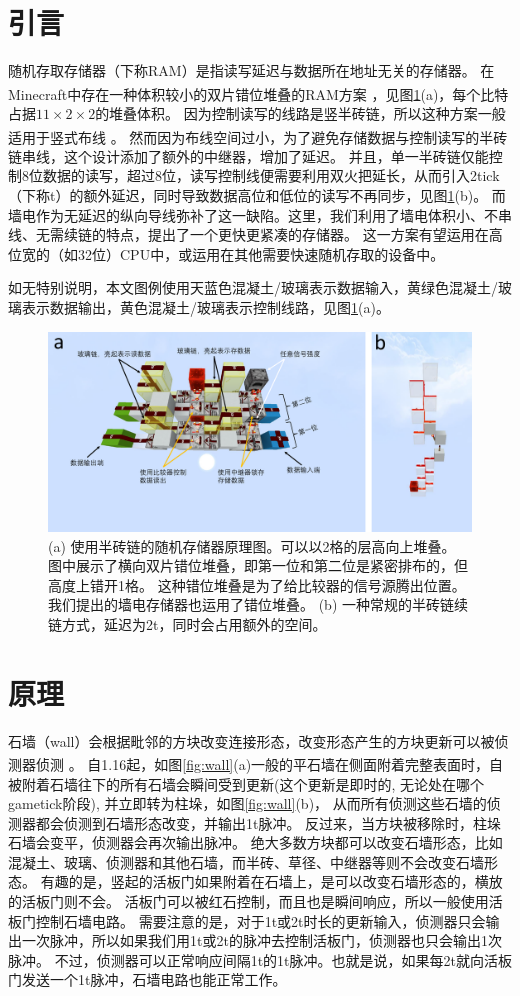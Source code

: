 \documentclass[UTF8,12pt,punct=kaiming,fontset=none]{ctexart}
\newcommand*{\upcite}[1]{
    \textsuperscript{\cite{#1}}
}
\begin{document}
\section{引言}
随机存取存储器（下称RAM）是指读写延迟与数据所在地址无关的存储器。
在Minecraft中存在一种体积较小的双片错位堆叠的RAM方案\upcite{ORE}，见图\ref{fig:normalRAM}(a)，每个比特占据$11\times 2\times 2$的堆叠体积。
因为控制读写的线路是竖半砖链，所以这种方案一般适用于竖式布线\upcite{Vertical}。
然而因为布线空间过小，为了避免存储数据与控制读写的半砖链串线，这个设计添加了额外的中继器，增加了延迟。
并且，单一半砖链仅能控制8位数据的读写，超过8位，读写控制线便需要利用双火把延长，从而引入2tick（下称t）的额外延迟，同时导致数据高位和低位的读写不再同步，见图\ref{fig:normalRAM}(b)。
而墙电作为无延迟的纵向导线弥补了这一缺陷。这里，我们利用了墙电体积小、不串线、无需续链的特点，提出了一个更快更紧凑的存储器。
这一方案有望运用在高位宽的（如32位）CPU中，或运用在其他需要快速随机存取的设备中。

如无特别说明，本文图例使用天蓝色混凝土/玻璃表示数据输入，黄绿色混凝土/玻璃表示数据输出，黄色混凝土/玻璃表示控制线路，见图\ref{fig:normalRAM}(a)。
\begin{figure}[t]
    \centering
    \includegraphics[width=.8\textwidth]{Fig1.pdf}
    \caption{\small (a) 使用半砖链的随机存储器原理图。可以以2格的层高向上堆叠。
    图中展示了横向双片错位堆叠，即第一位和第二位是紧密排布的，但高度上错开1格。
    这种错位堆叠是为了给比较器的信号源腾出位置。我们提出的墙电存储器也运用了错位堆叠。
    (b) 一种常规的半砖链续链方式，延迟为2t，同时会占用额外的空间。}
    \label{fig:normalRAM}
\end{figure}

\section{原理}
石墙（wall）会根据毗邻的方块改变连接形态，改变形态产生的方块更新可以被侦测器侦测\upcite{Wall}。
自1.16起，如图\ref{fig:wall}(a)一般的平石墙在侧面附着完整表面时，自被附着石墙往下的所有石墙会瞬间受到更新(这个更新是即时的, 无论处在哪个gametick阶段), 并立即转为柱垛，如图\ref{fig:wall}(b)，
从而所有侦测这些石墙的侦测器都会侦测到石墙形态改变，并输出1t脉冲。
反过来，当方块被移除时，柱垛石墙会变平，侦测器会再次输出脉冲。
绝大多数方块都可以改变石墙形态，比如混凝土、玻璃、侦测器和其他石墙，而半砖、草径、中继器等则不会改变石墙形态。
有趣的是，竖起的活板门如果附着在石墙上，是可以改变石墙形态的，横放的活板门则不会。
活板门可以被红石控制，而且也是瞬间响应，所以一般使用活板门控制石墙电路。
需要注意的是，对于1t或2t时长的更新输入，侦测器只会输出一次脉冲，所以如果我们用1t或2t的脉冲去控制活板门，侦测器也只会输出1次脉冲。
不过，侦测器可以正常响应间隔1t的1t脉冲。也就是说，如果每2t就向活板门发送一个1t脉冲，石墙电路也能正常工作。
\end{document}
